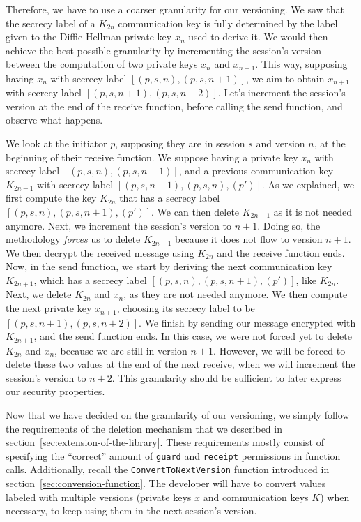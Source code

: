 Therefore, we have to use a coarser granularity for our versioning.
We saw that the secrecy label of a $K_{2n}$ communication key is fully determined by the label given to the Diffie-Hellman private key $x_{n}$ used to derive it.
We would then achieve the best possible granularity by incrementing the session's version between the computation of two private keys $x_{n}$ and $x_{n+1}$.
This way, supposing having $x_{n}$ with secrecy label $[(p,s,n),(p,s,n+1)]$, we aim to obtain $x_{n+1}$ with secrecy label $[(p,s,n+1),(p,s,n+2)]$.
Let's increment the session's version at the end of the receive function, before calling the send function, and observe what happens.

We look at the initiator $p$, supposing they are in session $s$ and version $n$, at the beginning of their receive function. We suppose having a private key $x_{n}$ with secrecy label $[(p,s,n),(p,s,n+1)]$, and a previous communication key $K_{2n-1}$ with secrecy label $[(p,s,n-1),(p,s,n),(p')]$.
As we explained, we first compute the key $K_{2n}$ that has a secrecy label $[(p,s,n),(p,s,n+1),(p')]$.
We can then delete $K_{2n-1}$ as it is not needed anymore.
Next, we increment the session's version to $n+1$.
Doing so, the methodology \emph{forces} us to delete $K_{2n-1}$ because it does not flow to version $n+1$.
We then decrypt the received message using $K_{2n}$ and the receive function ends.
Now, in the send function, we start by deriving the next communication key $K_{2n+1}$, which has a secrecy label $[(p,s,n),(p,s,n+1),(p')]$, like $K_{2n}$.
Next, we delete $K_{2n}$ and $x_{n}$, as they are not needed anymore.
We then compute the next private key $x_{n+1}$, choosing its secrecy label to be $[(p,s,n+1),(p,s,n+2)]$.
We finish by sending our message encrypted with $K_{2n+1}$, and the send function ends.
In this case, we were not forced yet to delete $K_{2n}$ and $x_{n}$, because we are still in version $n+1$.
However, we will be forced to delete these two values at the end of the next receive, when we will increment the session's version to $n+2$.
This granularity should be sufficient to later express our security properties.

Now that we have decided on the granularity of our versioning, we simply follow the requirements of the deletion mechanism that we described in section~\ref{sec:extension-of-the-library}.
These requirements mostly consist of specifying the “correct” amount of \texttt{guard} and \texttt{receipt} permissions in function calls. 
Additionally, recall the \texttt{ConvertToNextVersion} function introduced in section~\ref{sec:conversion-function}.
The developer will have to convert values labeled with multiple versions (private keys $x$ and communication keys $K$) when necessary, to keep using them in the next session's version.


